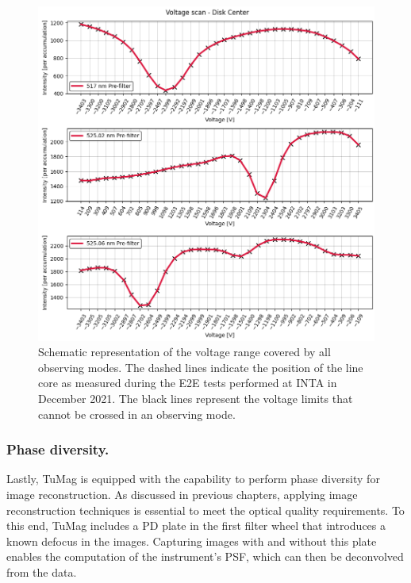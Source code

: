 \begin{figure}[t]
    \begin{minipage}[c]{0.67\textwidth}
      \includegraphics[width=\textwidth]{figures/Pipeline/Prefilter_scans.png}
    \end{minipage}\hfill
    \begin{minipage}[c]{0.29\textwidth}
      \caption{
       Schematic representation of the voltage range covered by all observing modes. The dashed lines indicate the position of the line core as measured during the E2E tests performed at INTA in December 2021. The black lines represent the voltage limits that cannot be crossed in an observing mode.
       \label{fig_pipeline:  prefilter_scans}
      } 
    \end{minipage}
  \end{figure}


\subsubsection{Phase diversity.}

Lastly, TuMag is equipped with the capability to perform phase diversity for image reconstruction. As discussed in previous chapters, applying image reconstruction techniques is essential to meet the optical quality requirements. To this end, TuMag includes a PD plate in the first filter wheel that introduces a known defocus in the images. Capturing images with and without this plate enables the computation of the instrument's PSF, which can then be deconvolved from the data.

